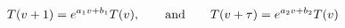 \begin{equation}
  T(v+1)= e^{a_1 v +b_1} T(v), \qquad {\rm and } \qquad
  T(v+\tau)= e^{a_2 v +b_2} T(v)
\end{equation}

